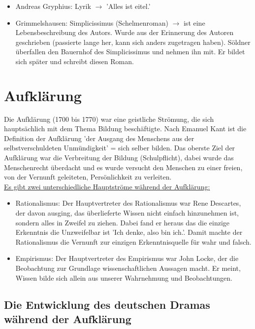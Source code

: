 \documentclass[12pt,a4paper]{article}
\begin{document}
\begin{itemize}
\item Andreas Gryphius: Lyrik $\rightarrow$ 'Alles ist eitel.'
\item Grimmelshausen: Simplicissimus (Schelmenroman) $\rightarrow$ ist eine Lebensbeschreibung des Autors. Wurde aus der Erinnerung des Autoren geschrieben (passierte lange her, kann sich anders zugetragen haben). Söldner überfallen den Bauernhof des Simplicissimus und nehmen ihn mit. Er bildet sich später und schreibt diesen Roman.
\end{itemize}

\newpage

\section{Aufklärung}

Die Aufklärung (1700 bis 1770) war eine geistliche Strömung, die sich hauptsächlich mit dem Thema Bildung beschäftigte. Nach Emanuel Kant ist die Definition der Aufklärung 'der Ausgang des Menschens aus der selbstverschuldeten Unmündigkeit' = sich selber bilden. Das oberste Ziel der Aufklärung war die Verbreitung der Bildung (Schulpflicht), dabei wurde das Menschenrecht überdacht und es wurde versucht den Menschen zu einer freien, von der Vernunft geleiteten, Persönlichkeit zu verleiten.\\

\underline{Es gibt zwei unterschiedliche Hauptströme während der Aufklärung:}

\begin{itemize}
\item Rationalismus: Der Hauptvertreter des Rationalismus war Rene Descartes, der davon ausging, das überlieferte Wissen nicht einfach hinzunehmen ist, sondern alles in Zweifel zu ziehen. Dabei fand er heraus das die einzige Erkenntnis die Unzweifelbar ist 'Ich denke, also bin ich.'. Damit machte der Rationalismus die Vernunft zur einzigen Erkenntnisquelle für wahr und falsch.
\item Empirismus: Der Hauptvertreter des Empirismus war John Locke, der die Beobachtung zur Grundlage wissenschaftlichen Aussagen macht. Er meint, Wissen bilde sich allein aus unserer Wahrnehmung und Beobachtungen.
\end{itemize}

\subsection{Die Entwicklung des deutschen Dramas während der Aufklärung}
\end{document}
